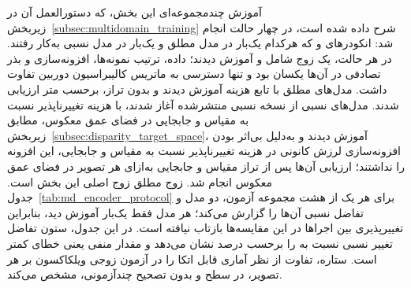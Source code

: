آموزش چندمجموعه‌ای این بخش، که دستورالعمل آن در زیربخش~\ref{subsec:multidomain_training} شرح داده شده است، در چهار حالت انجام شد: انکودرهای  و  که هرکدام یک‌بار در مدل مطلق و یک‌بار در مدل نسبی به‌کار رفتند. در هر حالت، یک زوج شامل \proposedmodel{} و \controlmodel{} آموزش دیدند؛ داده، ترتیب نمونه‌ها، افزونه‌سازی و بذر تصادفی در آن‌ها یکسان بود و تنها دسترسی به ماتریس کالیبراسیون دوربین تفاوت داشت. مدل‌های مطلق با تابع هزینه  آموزش دیدند و بدون تراز، برحسب متر ارزیابی شدند. مدل‌های نسبی از نسخه نسبی منتشرشده \basemodel{} آغاز شدند، با هزینه تغییرناپذیر نسبت به مقیاس و جابجایی در فضای عمق معکوس، مطابق زیربخش~\ref{subsec:disparity_target_space}، آموزش دیدند و به‌دلیل بی‌اثر بودن افزونه‌سازی لرزش کانونی در هزینه تغییرناپذیر نسبت به مقیاس و جابجایی، این افزونه را نداشتند؛ ارزیابی آن‌ها پس از تراز مقیاس و جابجایی به‌ازای هر تصویر در فضای عمق معکوس انجام شد. زوج مطلق  زوج اصلی این بخش است. جدول~\ref{tab:md_encoder_protocol} برای هر یک از هشت مجموعه آزمون،  دو مدل و تفاضل نسبی آن‌ها را گزارش می‌کند؛ هر مدل فقط یک‌بار آموزش دید، بنابراین تغییرپذیری بین اجراها در این مقایسه‌ها بازتاب نیافته است. در این جدول، ستون تفاضل تغییر نسبی \proposedmodel{} نسبت به \controlmodel{} را برحسب درصد نشان می‌دهد و مقدار منفی یعنی خطای \proposedmodel{} کمتر است. ستاره، تفاوت از نظر آماری قابل اتکا را در آزمون زوجی ویلکاکسون بر  هر تصویر، در سطح  و بدون تصحیح چندآزمونی، مشخص می‌کند.

